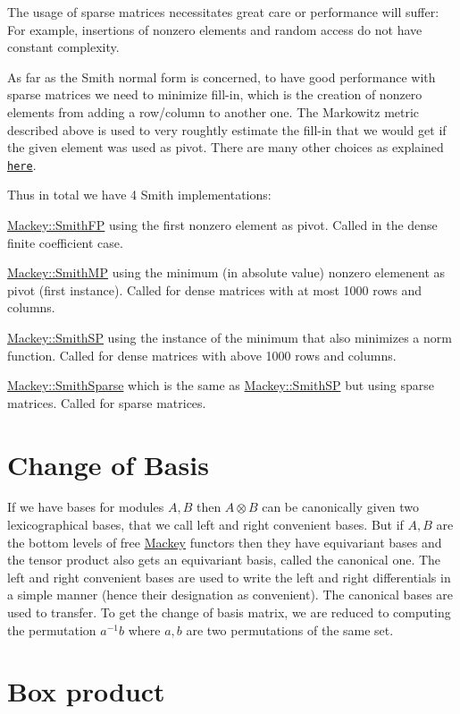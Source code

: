 The usage of sparse matrices necessitates great care or performance will suffer\+: For example, insertions of nonzero elements and random access do not have constant complexity.

As far as the Smith normal form is concerned, to have good performance with sparse matrices we need to minimize fill-\/in, which is the creation of nonzero elements from adding a row/column to another one. The Markowitz metric described above is used to very roughtly estimate the fill-\/in that we would get if the given element was used as pivot. There are many other choices as explained \href{https://arxiv.org/abs/math/9406205}{\tt here}.

Thus in total we have 4 Smith implementations\+:


\begin{DoxyItemize}
\item {\ttfamily \hyperlink{classMackey_1_1SmithFP}{Mackey\+::\+Smith\+FP}} using the first nonzero element as pivot. Called in the dense finite coefficient case.
\item {\ttfamily \hyperlink{classMackey_1_1SmithMP}{Mackey\+::\+Smith\+MP}} using the minimum (in absolute value) nonzero elemenent as pivot (first instance). Called for dense matrices with at most 1000 rows and columns.
\item {\ttfamily \hyperlink{classMackey_1_1SmithSP}{Mackey\+::\+Smith\+SP}} using the instance of the minimum that also minimizes a norm function. Called for dense matrices with above 1000 rows and columns.
\item {\ttfamily \hyperlink{classMackey_1_1SmithSparse}{Mackey\+::\+Smith\+Sparse}} which is the same as {\ttfamily \hyperlink{classMackey_1_1SmithSP}{Mackey\+::\+Smith\+SP}} but using sparse matrices. Called for sparse matrices.
\end{DoxyItemize}\hypertarget{algo_cob}{}\section{Change of Basis}\label{algo_cob}
If we have bases for modules $A,B$ then $A\otimes B$ can be canonically given two lexicographical bases, that we call left and right convenient bases. But if $A,B$ are the bottom levels of free \hyperlink{namespaceMackey}{Mackey} functors then they have equivariant bases and the tensor product also gets an equivariant basis, called the canonical one. The left and right convenient bases are used to write the left and right differentials in a simple manner (hence their designation as convenient). The canonical bases are used to transfer. To get the change of basis matrix, we are reduced to computing the permutation $a^{-1}b$ where $a,b$ are two permutations of the same set.\hypertarget{algo_box}{}\section{Box product}\label{algo_box}
